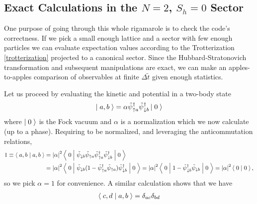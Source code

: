 \subsection{Exact Calculations in the $N=2$, $S_h=0$ Sector}

One purpose of going through this whole rigamarole is to check the code's correctness.
If we pick a small enough lattice and a sector with few enough particles we can evaluate expectation values according to the Trotterization \eqref{trotterization} projected to a canonical sector.
Since the Hubbard-Stratonovich transformation and subsequent manipulations are exact, we can make an apples-to-apples comparison of observables at finite $\Delta \tilde{t}$ given enough statistics.

Let us proceed by evaluating the kinetic and potential in a two-body state
\begin{align}
    \left|\;a,b\;\right\rangle = \alpha \tilde{\psi}{}^{\dagger}_{\uparrow a} \tilde{\psi}{}^{\dagger}_{\downarrow b} \left|\;0\;\right\rangle
\end{align}
where $\left|\;0\;\right\rangle$ is the Fock vacuum and $\alpha$ is a normalization which we now calculate (up to a phase).
Requiring  to be normalized, and leveraging the anticommutation relations,
\begin{align}
    1\equiv\left\langle\;a,b\;\middle|\;a,b\;\right\rangle 
    &= \left| \alpha \right|^2 \left\langle\;0\;\middle|\;\tilde{\psi}_{\downarrow b}\tilde{\psi}_{\uparrow a} \tilde{\psi}{}^{\dagger}_{\uparrow a} \tilde{\psi}{}^{\dagger}_{\downarrow b}\;\middle|\;0\;\right\rangle
    \nonumber\\
    &= \left| \alpha \right|^2 \left\langle\;0\;\middle|\;\tilde{\psi}_{\downarrow b}(1-\tilde{\psi}{}^{\dagger}_{\uparrow a} \tilde{\psi}_{\uparrow a}) \tilde{\psi}{}^{\dagger}_{\downarrow b}\;\middle|\;0\;\right\rangle
    = \left| \alpha \right|^2 \left\langle\;0\;\middle|\;1-\tilde{\psi}{}^{\dagger}_{\downarrow b} \tilde{\psi}_{\downarrow b}\;\middle|\;0\;\right\rangle
    = \left| \alpha \right|^2 \left\langle\;0\;\middle|\;0\;\right\rangle,
\end{align}
so we pick $\alpha=1$ for convenience.
A similar calculation shows that we have
\begin{align}
    \left\langle\;c,d\;\middle|\;a,b\;\right\rangle = \delta_{ac}\delta_{bd}
\end{align}

